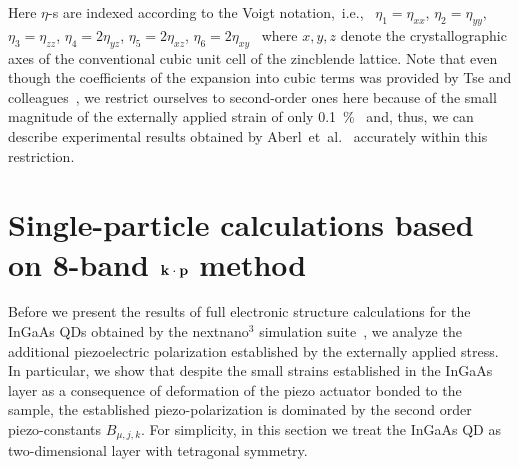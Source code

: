 %
%
Here $\eta$-s are indexed according to the Voigt notation,~i.e.,~ $\eta_1=\eta_{xx}$, $\eta_2=\eta_{yy}$, $\eta_3=\eta_{zz}$, $\eta_4=2\eta_{yz}$, $\eta_5=2\eta_{xz}$, $\eta_6=2\eta_{xy}$~\cite{Beya-Wakata2011} where $x,y,z$ denote the crystallographic axes of the conventional cubic unit cell of the zincblende lattice.
%
%
Note that even though the coefficients of the expansion into cubic
terms was provided by Tse and colleagues~\cite{Tse2013}, we restrict ourselves to second-order ones here because of the small magnitude of the externally applied strain of only 0.1~\%~\cite{Aberl:17} and, thus, we can describe experimental results obtained by Aberl~et~al.~\cite{Aberl:17} accurately within this restriction. 


\section{Single-particle calculations based on 8-band $\bf{k \cdot p}$ method}




Before we present the results of full electronic structure calculations for the InGaAs QDs obtained by the nextnano$^3$ simulation suite~\cite{Birner:07}, we analyze the additional piezoelectric polarization established by the externally applied stress. In particular, we show that despite the small strains established in the InGaAs layer as a consequence of deformation of the piezo actuator bonded to the sample, the established piezo-polarization is dominated by the second order piezo-constants $B_{\mu,j,k}$. For simplicity, in this section we treat the InGaAs QD as two-dimensional layer with tetragonal symmetry.    


